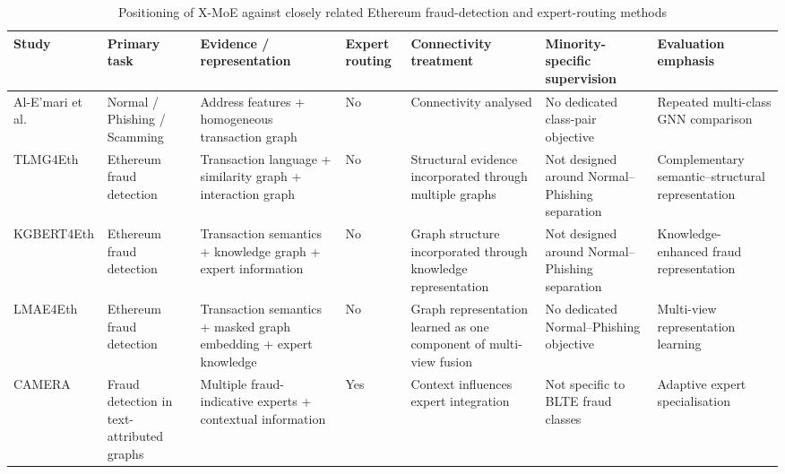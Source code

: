 \documentclass{ieeeaccess}
\begin{document}
\begin{table}[t]
\centering
\caption{Positioning of X-MoE against closely related Ethereum fraud-detection and expert-routing methods}
\label{tab:xmoe_positioning}

\renewcommand{\arraystretch}{1.12}
\setlength{\tabcolsep}{3.2pt}
\scriptsize

\begin{tabularx}{\textwidth}{
>{\raggedright\arraybackslash}p{2.15cm}
>{\raggedright\arraybackslash}p{2.15cm}
>{\raggedright\arraybackslash}p{2.55cm}
>{\centering\arraybackslash}p{1.45cm}
>{\raggedright\arraybackslash}p{2.15cm}
>{\raggedright\arraybackslash}p{2.35cm}
>{\raggedright\arraybackslash}X
}

\toprule

\textbf{Study} &
\textbf{Primary task} &
\textbf{Evidence / representation} &
\textbf{Expert routing} &
\textbf{Connectivity treatment} &
\textbf{Minority-specific supervision} &
\textbf{Evaluation emphasis} \\

\midrule

Al-E'mari et al. \cite{alemari2026multiclass}
&
Normal / Phishing / Scamming
&
Address features + homogeneous transaction graph
&
No
&
Connectivity analysed
&
No dedicated class-pair objective
&
Repeated multi-class GNN comparison
\\[2pt]

TLMG4Eth \cite{sun2025tlmg4eth}
&
Ethereum fraud detection
&
Transaction language + similarity graph + interaction graph
&
No
&
Structural evidence incorporated through multiple graphs
&
Not designed around Normal--Phishing separation
&
Complementary semantic--structural representation
\\[2pt]

KGBERT4Eth \cite{jia2026kgbert4eth}
&
Ethereum fraud detection
&
Transaction semantics + knowledge graph + expert information
&
No
&
Graph structure incorporated through knowledge representation
&
Not designed around Normal--Phishing separation
&
Knowledge-enhanced fraud representation
\\[2pt]

LMAE4Eth \cite{jia2025lmae4eth}
&
Ethereum fraud detection
&
Transaction semantics + masked graph embedding + expert knowledge
&
No
&
Graph representation learned as one component of multi-view fusion
&
No dedicated Normal--Phishing objective
&
Multi-view representation learning
\\[2pt]

CAMERA \cite{pan2026camera}
&
Fraud detection in text-attributed graphs
&
Multiple fraud-indicative experts + contextual information
&
Yes
&
Context influences expert integration
&
Not specific to BLTE fraud classes
&
Adaptive expert specialisation
\\[2pt]


\end{tabularx}
\end{table}
\end{document}
